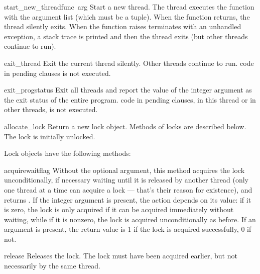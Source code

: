 \begin{funcdesc}{start_new_thread}{func\, arg}
Start a new thread.  The thread executes the function 
with the argument list  (which must be a tuple).  When the
function returns, the thread silently exits.  When the function raises
terminates with an unhandled exception, a stack trace is printed and
then the thread exits (but other threads continue to run).
\end{funcdesc}

\begin{funcdesc}{exit_thread}{}
Exit the current thread silently.  Other threads continue to run.
 code in pending  clauses is not executed.
\end{funcdesc}

\begin{funcdesc}{exit_prog}{status}
Exit all threads and report the value of the integer argument
 as the exit status of the entire program.
 code in pending  clauses, in this thread
or in other threads, is not executed.
\end{funcdesc}

\begin{funcdesc}{allocate_lock}{}
Return a new lock object.  Methods of locks are described below.  The
lock is initially unlocked.
\end{funcdesc}

Lock objects have the following methods:

\renewcommand{\indexsubitem}{(lock method)}
\begin{funcdesc}{acquire}{waitflag}
Without the optional argument, this method acquires the lock
unconditionally, if necessary waiting until it is released by another
thread (only one thread at a time can acquire a lock --- that's their
reason for existence), and returns .  If the integer
 argument is present, the action depends on its value:
if it is zero, the lock is only acquired if it can be acquired
immediately without waiting, while if it is nonzero, the lock is
acquired unconditionally as before.  If an argument is present, the
return value is 1 if the lock is acquired successfully, 0 if not.
\end{funcdesc}

\begin{funcdesc}{release}{}
Releases the lock.  The lock must have been acquired earlier, but not
necessarily by the same thread.
\end{funcdesc}

